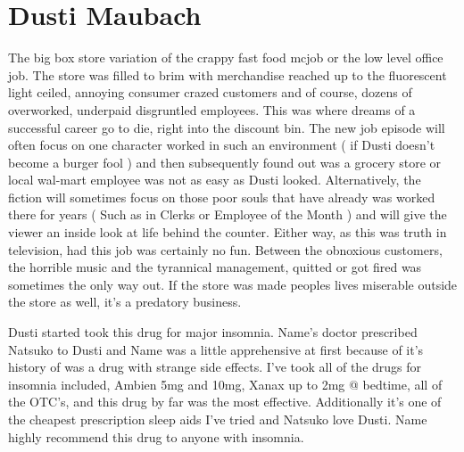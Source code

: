 \documentclass[12pt]{book}
\begin{document}
\chapter{Dusti Maubach}

The big box store variation of the crappy fast food mcjob or the low level office job. The store was filled to brim with merchandise reached up to the fluorescent light ceiled, annoying consumer crazed customers and of course, dozens of overworked, underpaid disgruntled employees. This was where dreams of a successful career go to die, right into the discount bin. The new job episode will often focus on one character worked in such an environment ( if Dusti doesn't become a burger fool ) and then subsequently found out was a grocery store or local wal-mart employee was not as easy as Dusti looked. Alternatively, the fiction will sometimes focus on those poor souls that have already was worked there for years ( Such as in Clerks or Employee of the Month ) and will give the viewer an inside look at life behind the counter. Either way, as this was truth in television, had this job was certainly no fun. Between the obnoxious customers, the horrible music and the tyrannical management, quitted or got fired was sometimes the only way out. If the store was made peoples lives miserable outside the store as well, it's a predatory business.



Dusti started took this drug for major insomnia. Name's doctor prescribed Natsuko to Dusti and Name was a little apprehensive at first because of it's history of was a drug with strange side effects. I've took all of the drugs for insomnia included, Ambien 5mg and 10mg, Xanax up to 2mg @ bedtime, all of the OTC's, and this drug by far was the most effective. Additionally it's one of the cheapest prescription sleep aids I've tried and Natsuko love Dusti. Name highly recommend this drug to anyone with insomnia.
\end{document}
